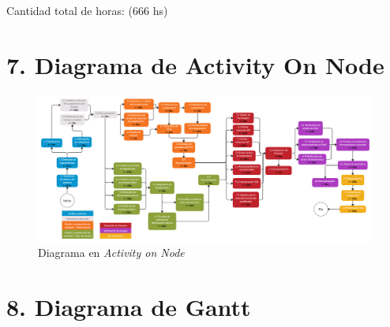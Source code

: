 \documentclass[11pt]{charter}
\begin{document}
Cantidad total de horas: (666 hs)


\section{7. Diagrama de Activity On Node}
\label{sec:AoN}

\begin{landscape}
\begin{figure}[H]
\centering 
\includegraphics[width=1.6\textwidth]{./Figuras/AoN.png}
\caption{Diagrama en \textit{Activity on Node}}
\label{fig:AoN1}
\end{figure}
\end{landscape}

\section{8. Diagrama de Gantt}
\label{sec:gantt}
\end{document}
